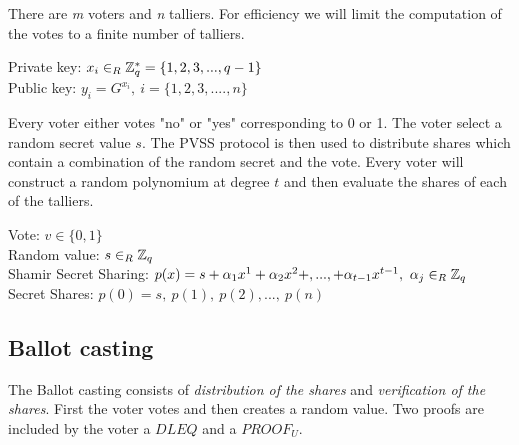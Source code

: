 \noindent
There are \textit{m} voters and \textit{n} talliers. For efficiency we will limit the computation of the votes to a finite number of talliers. 

\noindent
\begin{infobox}
Private key: \begin{math}x_{i} \in_R \mathbb{Z}_q^* = \{1,2,3,...,q-1\}\end{math}\\
Public key: \begin{math}y_i=G^{x_i} ,\ i=\{1,2,3,...., n \}  \end{math}
\end{infobox}


\noindent
Every voter either votes "no" or "yes" corresponding to 0 or 1. The voter select a random secret value \begin{math}s \end{math}. The PVSS protocol is then used to distribute shares which contain a combination of the random secret and the vote. Every voter will construct a random polynomium at degree $t$ and then evaluate the shares  of each of the talliers.


\noindent
\begin{infobox}
Vote: \begin{math}v\in\{0,1\} \end{math}\\
Random value: \begin{math} s\in_R \mathbb{Z}_q \end{math}\\ 
Shamir Secret Sharing: \begin{math} p(x)=s+\alpha_1x^1+\alpha_2x^2+,...,+\alpha_{t-1}x^{t-1}, \ \alpha_j\in_R \Z_q  \end{math}\\
Secret Shares: \begin{math} p(0)=s,\ p(1),\ p(2),...,\ p(n) \end{math}
\end{infobox}

\subsection{Ballot casting}
The  Ballot casting consists of \textit{distribution of the shares} and \textit{verification of the shares}. First the voter votes and then creates a random value. Two proofs are included by the voter a $DLEQ$ and a $PROOF_U$.\\

